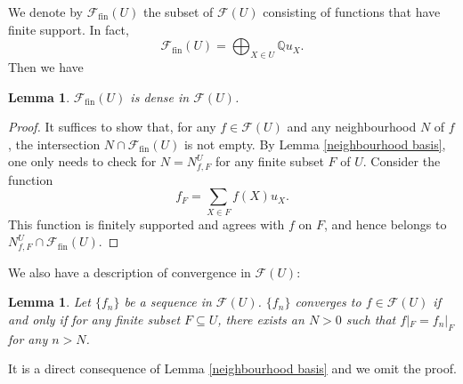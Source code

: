 \documentclass[a4paper,12pt]{amsart}
\numberwithin{equation}{section}
\newtheorem{lemma}[theorem]{Lemma}
\newcommand{\1}{\mathbf{1}}
\newcommand{\fin}{\mathrm{fin}}
\begin{document}
We denote by $\mathscr{F}_{\fin}(U)$ the subset of $\mathscr{F}(U)$ consisting of functions that have finite support. In fact,
\[\mathscr{F}_{\fin}(U)=\bigoplus_{X\in U}\mathbb{Q}u_X.\]
Then we have
\begin{lemma}\label{density}
    $\mathscr{F}_{\fin}(U)$ is dense in $\mathscr{F}(U)$.
\end{lemma}
\begin{proof}
    It suffices to show that, for any $f\in\mathscr{F}(U)$ and any neighbourhood $N$ of $f$, the intersection $N\cap\mathscr{F}_{\fin}(U)$ is not empty. By Lemma \ref{neighbourhood basis}, one only needs to check for $N=N^U_{f,F}$ for any finite subset $F$ of $U$. Consider the function
    \[f_F=\sum_{X\in F}f(X)u_X.\]
    This function is finitely supported and agrees with $f$ on $F$, and hence belongs to $N^U_{f,F}\cap\mathscr{F}_{\fin}(U)$.
\end{proof}

We also have a description of convergence in $\mathscr{F}(U)$:
\begin{lemma}\label{convergence}
    Let $\{f_n\}$ be a sequence in $\mathscr{F}(U)$. $\{f_n\}$ converges to $f\in\mathscr{F}(U)$ if and only if for any finite subset $F\subseteq U$, there exists an $N>0$ such that $f|_F=f_n|_F$ for any $n>N$.
\end{lemma}
It is a direct consequence of Lemma \ref{neighbourhood basis} and we omit the proof.
\end{document}
